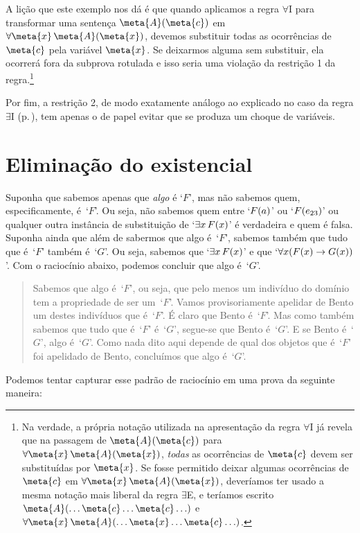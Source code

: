A lição que este exemplo nos dá é que quando aplicamos a regra $\forall$I para transformar uma sentença $\meta{A}(\meta{c})$ em $\forall \meta{x}\,\meta{A}(\meta{x})$, devemos substituir todas as ocorrências de $\meta{c}$ pela variável $\meta{x}$.
Se deixarmos alguma sem substituir, ela ocorrerá fora da subprova rotulada e isso seria uma violação da restrição 1 da regra.\footnote{
	Na verdade, a própria notação utilizada na apresentação da regra $\forall$I já revela que na passagem de $\meta{A}(\meta{c})$ para $\forall \meta{x}\,\meta{A}(\meta{x})$, \textit{todas} as ocorrências de $\meta{c}$ devem ser substituídas por $\meta{x}$.
	Se fosse permitido deixar algumas ocorrências de $\meta{c}$ em $\forall \meta{x}\,\meta{A}(\meta{x})$, deveríamos ter usado a mesma notação mais liberal da regra $\exists$E, e teríamos escrito $\meta{A}(\ldots \meta{c}\ldots\meta{c}\ldots)$ e  $\forall \meta{x}\,\meta{A}(\ldots\meta{x}\ldots\meta{c}\ldots)$.}

Por fim, a restrição 2, de modo exatamente análogo ao explicado no caso da regra $\exists$I (p.\,\pageref{RegraEI}), tem apenas o de papel evitar que se produza um choque de variáveis.

\section{Eliminação do existencial}
Suponha que sabemos apenas que \emph{algo}  é `$F$’, mas não sabemos quem, especificamente,  é~`$F$'.  Ou seja, não sabemos quem entre `$\mathord{F}(a)$’ ou `$\mathord{F}(e_{23})$’ ou qualquer outra instância de substituição de `$\exists x\,\mathord{F}(x)$’ é verdadeira e quem é falsa.  Suponha ainda que além de sabermos que algo  é~`$F$’, sabemos também que tudo que
é~`$F$' também é~`$G$'.  Ou seja, sabemos que `$\exists x\,\mathord{F}(x)$’ e que `$\forall x(\mathord{F}(x) \rightarrow \mathord{G}(x))$’. Com o raciocínio abaixo, podemos concluir que algo é~`$G$’.
 
\begin{quote}
Sabemos que algo é~`$F$', ou seja, que pelo menos um indivíduo do domínio tem a propriedade de ser um~`$F$'. Vamos provisoriamente apelidar de Bento um destes indivíduos que é~`$F$'. É claro que Bento é~`$F$'. Mas como também sabemos que tudo que é~`$F$' é~`$G$', segue-se que Bento é~`$G$'. E se Bento é~`$G$', algo é~`$G$'. Como nada dito aqui depende de qual dos objetos que é~`$F$’ foi apelidado de Bento, concluímos que algo é~`$G$'.		
	\end{quote}
 Podemos tentar capturar esse padrão de raciocínio em uma prova da seguinte maneira:
\begin{fitchproof}
	\open
		 
	\close
\end{fitchproof}\noindent

